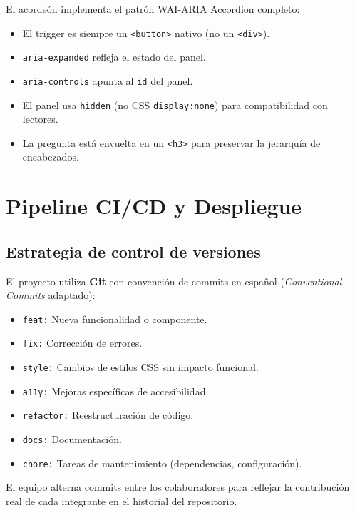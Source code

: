 \documentclass[12pt, a4paper]{report}
\begin{document}
El acordeón implementa el patrón WAI-ARIA Accordion completo:

\begin{itemize}
  \item El trigger es siempre un \texttt{<button>} nativo (no un \texttt{<div>}).
  \item \texttt{aria-expanded} refleja el estado del panel.
  \item \texttt{aria-controls} apunta al \texttt{id} del panel.
  \item El panel usa \texttt{hidden} (no CSS \texttt{display:none}) para compatibilidad con lectores.
  \item La pregunta está envuelta en un \texttt{<h3>} para preservar la jerarquía de encabezados.
\end{itemize}

\chapter{Pipeline CI/CD y Despliegue}

\section{Estrategia de control de versiones}

El proyecto utiliza \textbf{Git} con convención de commits en español (\textit{Conventional Commits} adaptado):

\begin{itemize}
  \item \texttt{feat:} Nueva funcionalidad o componente.
  \item \texttt{fix:} Corrección de errores.
  \item \texttt{style:} Cambios de estilos CSS sin impacto funcional.
  \item \texttt{a11y:} Mejoras específicas de accesibilidad.
  \item \texttt{refactor:} Reestructuración de código.
  \item \texttt{docs:} Documentación.
  \item \texttt{chore:} Tareas de mantenimiento (dependencias, configuración).
\end{itemize}

El equipo alterna commits entre los colaboradores para reflejar la contribución real de cada integrante en el historial del repositorio.
\end{document}
